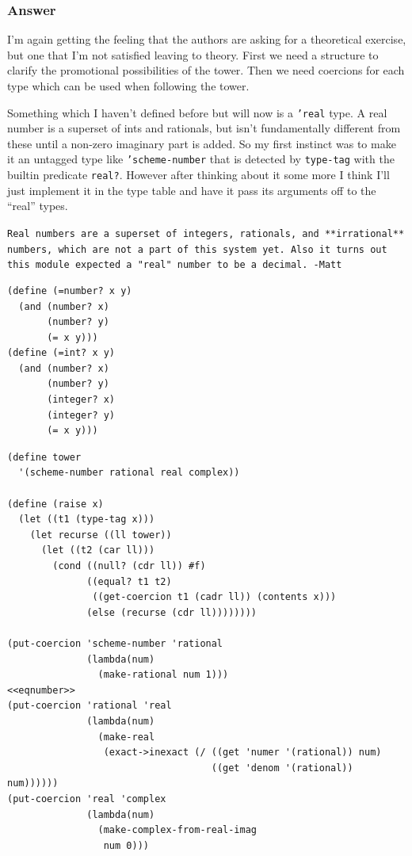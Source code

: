 \documentclass[final,fleqn,titlepage,twoside]{article}
\begin{document}
\subsubsection{Answer}
\label{sec:org9a4fab3}
I'm again getting the feeling that the authors are asking for a theoretical
exercise, but one that I'm not satisfied leaving to theory. First we need a
structure to clarify the promotional possibilities of the tower. Then we need
coercions for each type which can be used when following the tower.

Something which I haven't defined before but will now is a \texttt{'real}
type. A real number is a superset of ints and rationals, but isn't fundamentally
different from these until a non-zero imaginary part is added. So my first
instinct was to make it an untagged type like \texttt{'scheme-number} that is
detected by \texttt{type-tag} with the builtin predicate \texttt{real?}.
However after thinking about it some more I think I'll just implement it in the
type table and have it pass its arguments off to the ``real'' types.

\texttt{Real numbers are a superset of integers, rationals, and **irrational** numbers,
which are not a part of this system yet. Also it turns out this module expected
a "real" number to be a decimal. -Matt}

\begin{verbatim}
(define (=number? x y)
  (and (number? x)
       (number? y)
       (= x y)))
(define (=int? x y)
  (and (number? x)
       (number? y)
       (integer? x)
       (integer? y)
       (= x y)))
\end{verbatim}
\begin{verbatim}
(define tower
  '(scheme-number rational real complex))

(define (raise x)
  (let ((t1 (type-tag x)))
    (let recurse ((ll tower))
      (let ((t2 (car ll)))
        (cond ((null? (cdr ll)) #f)
              ((equal? t1 t2)
               ((get-coercion t1 (cadr ll)) (contents x)))
              (else (recurse (cdr ll))))))))

(put-coercion 'scheme-number 'rational
              (lambda(num)
                (make-rational num 1)))
<<eqnumber>>
(put-coercion 'rational 'real
              (lambda(num)
                (make-real
                 (exact->inexact (/ ((get 'numer '(rational)) num)
                                    ((get 'denom '(rational)) num))))))
(put-coercion 'real 'complex
              (lambda(num)
                (make-complex-from-real-imag
                 num 0)))
\end{verbatim}
\end{document}
